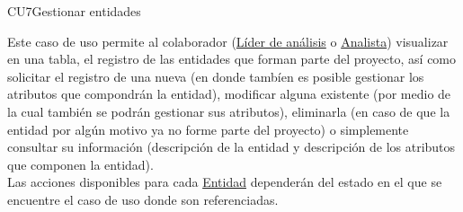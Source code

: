 	\begin{UseCase}{CU7}{Gestionar entidades}{
			
		Este caso de uso permite al colaborador (\hyperlink{jefe}{Líder de análisis} o \hyperlink{analista}{Analista}) visualizar en una tabla, el registro de las entidades que forman parte del proyecto, así como solicitar el registro de una nueva (en donde tambíen es posible gestionar los atributos que compondrán la entidad), modificar alguna existente (por medio de la cual también se podrán gestionar sus atributos), eliminarla (en caso de que la entidad por algún motivo ya no forme parte del proyecto) o simplemente consultar su información (descripción de la entidad y descripción de los atributos que componen la entidad). \\
     	Las acciones disponibles para cada \hyperlink{entidadEntidad}{Entidad} dependerán del estado en el que se encuentre el caso de uso donde son referenciadas. 
	}
	
\end{UseCase}
